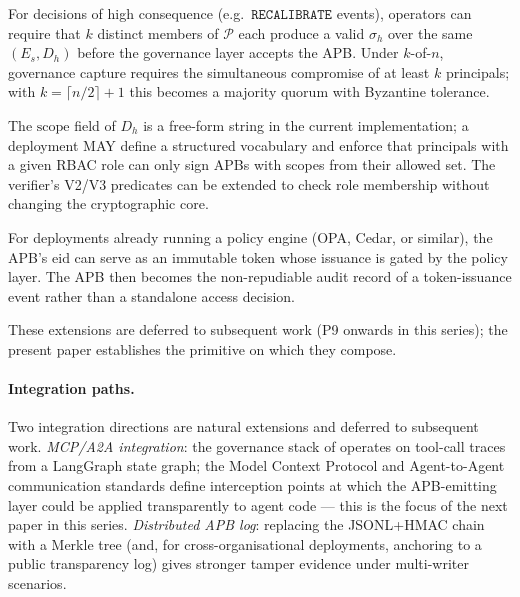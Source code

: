 \documentclass[11pt]{article}
\newcommand{\RECAL}{\texttt{RECALIBRATE}}
\newcommand{\Pset}{\mathcal{P}}
\newcommand{\Es}{E_s}
\newcommand{\Dh}{D_h}
\newcommand{\sigh}{\sigma_h}
\begin{document}
\begin{description}[leftmargin=2em, topsep=2pt, itemsep=3pt]
  \item[$k$-of-$n$ threshold signing.] For decisions of high
  consequence (e.g.\ $\RECAL$ events), operators can require
  that $k$ distinct members of $\Pset$ each produce a valid
  $\sigh$ over the same $(\Es, \Dh)$ before the governance
  layer accepts the APB. Under $k$-of-$n$, governance capture
  requires the simultaneous compromise of at least $k$
  principals; with $k = \lceil n/2 \rceil + 1$ this becomes a
  majority quorum with Byzantine tolerance.

  \item[Role-based authority scoping.] The $\mathrm{scope}$ field
  of $\Dh$ is a free-form string in the current implementation;
  a deployment MAY define a structured vocabulary and enforce
  that principals with a given RBAC role can only sign APBs
  with scopes from their allowed set. The verifier's V2/V3
  predicates can be extended to check role membership without
  changing the cryptographic core.

  \item[Capability tokens and policy engines.] For deployments
  already running a policy engine (OPA, Cedar, or similar),
  the APB's $\mathrm{eid}$ can serve as an immutable token
  whose issuance is gated by the policy layer. The APB then
  becomes the non-repudiable audit record of a token-issuance
  event rather than a standalone access decision.
\end{description}

These extensions are deferred to subsequent work (P9 onwards in
this series); the present paper establishes the primitive on which
they compose.

\paragraph{Integration paths.}
Two integration directions are natural extensions and deferred to
subsequent work. \emph{MCP/A2A integration}: the governance stack of
\citep{fernandez2026applied} operates on tool-call traces from a
LangGraph state graph; the Model Context Protocol and Agent-to-Agent
communication standards define interception points at which the
APB-emitting layer could be applied transparently to agent code
--- this is the focus of the next paper in this series.
\emph{Distributed APB log}: replacing the JSONL+HMAC chain with a
Merkle tree (and, for cross-organisational deployments, anchoring
to a public transparency log) gives stronger tamper evidence under
multi-writer scenarios.
\end{document}
